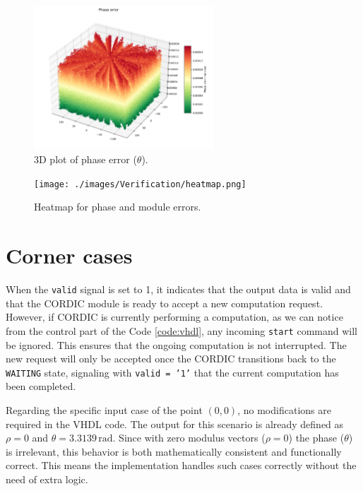 \begin{figure}[H]
    \centering
    \includegraphics[width=0.6\textwidth]{./images/Verification/phase_error.png}
    \caption{3D plot of phase error (\( \theta \)).}
    \label{fig:phase_error}
\end{figure}

\begin{figure}[H]
    \centering
    \texttt{[image: ./images/Verification/heatmap.png]}
    \caption{Heatmap for phase and module errors.}
    \label{fig:heatmap_error}
\end{figure}

\section{Corner cases}

When the \texttt{valid} signal is set to 1, it indicates that the output data is valid and that the CORDIC module is ready to accept a new computation request. However, if CORDIC is currently performing a computation, as we can notice from the control part of the Code \ref{code:vhdl}, any incoming \texttt{start} command will be ignored. This ensures that the ongoing computation is not interrupted. The new request will only be accepted once the CORDIC transitions back to the \texttt{WAITING} state, signaling with \texttt{valid = '1'} that the current computation has been completed.

Regarding the specific input case of the point \((0, 0)\), no modifications are required in the VHDL code. The output for this scenario is already defined as \( \rho = 0 \) and \( \theta = 3.3139 \, \text{rad} \). Since with zero modulus vectors (\( \rho = 0 \)) the phase (\( \theta \)) is irrelevant, this behavior is both mathematically consistent and functionally correct. This means the implementation handles such cases correctly without the need of extra logic.

